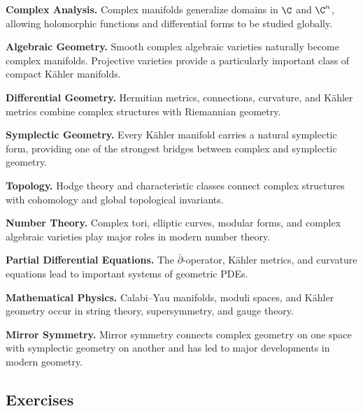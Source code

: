 \begin{applicationbox}
\textbf{Complex Analysis.}
Complex manifolds generalize domains in \(\C\) and \(\C^n\), allowing
holomorphic functions and differential forms to be studied globally.

\medskip

\textbf{Algebraic Geometry.}
Smooth complex algebraic varieties naturally become complex manifolds.
Projective varieties provide a particularly important class of compact
K\"ahler manifolds.

\medskip

\textbf{Differential Geometry.}
Hermitian metrics, connections, curvature, and K\"ahler metrics combine
complex structures with Riemannian geometry.

\medskip

\textbf{Symplectic Geometry.}
Every K\"ahler manifold carries a natural symplectic form, providing one of
the strongest bridges between complex and symplectic geometry.

\medskip

\textbf{Topology.}
Hodge theory and characteristic classes connect complex structures with
cohomology and global topological invariants.

\medskip

\textbf{Number Theory.}
Complex tori, elliptic curves, modular forms, and complex algebraic varieties
play major roles in modern number theory.

\medskip

\textbf{Partial Differential Equations.}
The \(\bar{\partial}\)-operator, K\"ahler metrics, and curvature equations
lead to important systems of geometric PDEs.

\medskip

\textbf{Mathematical Physics.}
Calabi--Yau manifolds, moduli spaces, and K\"ahler geometry occur in string
theory, supersymmetry, and gauge theory.

\medskip

\textbf{Mirror Symmetry.}
Mirror symmetry connects complex geometry on one space with symplectic
geometry on another and has led to major developments in modern geometry.
\end{applicationbox}

\subsection{Exercises}
\label{subsec:complex-geometry-exercises}

